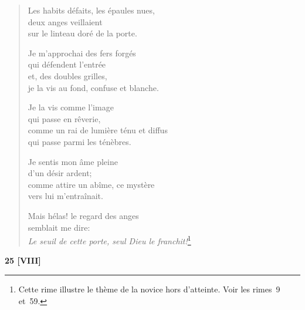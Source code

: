 \begin{verse}
  Les habits défaits,
  les épaules nues, \\
  deux anges veillaient \\
  sur le linteau doré de la porte.

  Je m'approchai des fers forgés \\
  qui défendent l'entrée \\
  et, des doubles grilles, \\
  je la vis au fond, confuse et blanche.

  Je la vis comme l'image \\
  qui passe en rêverie, \\
  comme un rai de lumière ténu et diffus \\
  qui passe parmi les ténèbres.

  Je sentis mon âme pleine \\
  d'un désir ardent; \\
  comme attire un abîme, ce mystère \\
  vers lui m'entraînait.

  Mais hélas! le regard des anges \\
  semblait me dire: \\
  \emph{Le seuil de cette porte,
  seul Dieu le franchit!}\footnote{Cette rime illustre le thème de la
  novice hors d'atteinte. Voir les rimes~9 et~59.}
\end{verse}

\smallskip

\begin{center}
  \textbf{25 [VIII]}
\end{center}

